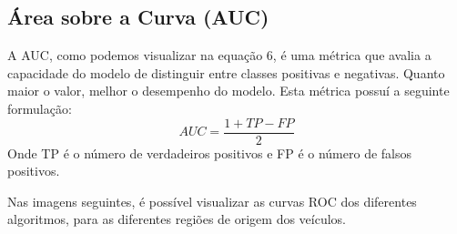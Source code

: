\documentclass[conference]{IEEEtran}
\begin{document}
\subsection{Área sobre a Curva (AUC)}
A AUC, como podemos visualizar na equação 6, é uma métrica que avalia a capacidade do modelo de distinguir entre classes positivas e negativas. Quanto maior o valor, melhor o desempenho do modelo.
Esta métrica possuí a seguinte formulação:
\begin{equation}
	AUC = \frac{1 + TP - FP}{2}
\end{equation}
Onde TP é o número de verdadeiros positivos e FP é o número de falsos positivos.

Nas imagens seguintes, é possível visualizar as curvas ROC dos diferentes algoritmos, para as diferentes regiões de origem dos veículos.
\end{document}
